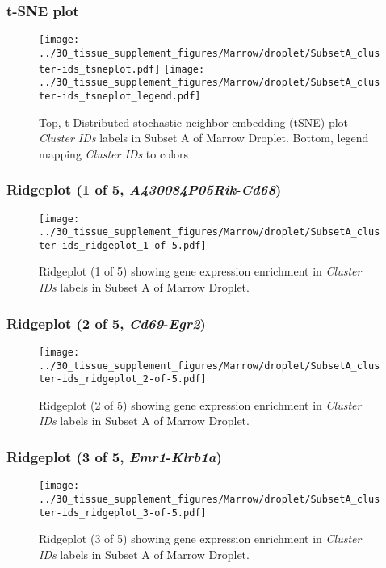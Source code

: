 \clearpage
\subsubsection{t-SNE plot}
\begin{figure}[h]
\centering
\texttt{[image: ../30\_tissue\_supplement\_figures/Marrow/droplet/SubsetA\_cluster-ids\_tsneplot.pdf]}
\texttt{[image: ../30\_tissue\_supplement\_figures/Marrow/droplet/SubsetA\_cluster-ids\_tsneplot\_legend.pdf]}
\caption{Top, t-Distributed stochastic neighbor embedding (tSNE) plot  \emph{Cluster IDs} labels in Subset A of Marrow Droplet. Bottom, legend mapping \emph{Cluster IDs} to colors}
\end{figure}


\clearpage

\subsubsection{Ridgeplot (1 of 5, \emph{A430084P05Rik}-\emph{Cd68})}
\begin{figure}[h]
\centering
\texttt{[image: ../30\_tissue\_supplement\_figures/Marrow/droplet/SubsetA\_cluster-ids\_ridgeplot\_1-of-5.pdf]}

\caption{ Ridgeplot (1 of 5)  showing gene expression enrichment in \emph{Cluster IDs} labels in Subset A of Marrow Droplet. }
\end{figure}


\clearpage

\subsubsection{Ridgeplot (2 of 5, \emph{Cd69}-\emph{Egr2})}
\begin{figure}[h]
\centering
\texttt{[image: ../30\_tissue\_supplement\_figures/Marrow/droplet/SubsetA\_cluster-ids\_ridgeplot\_2-of-5.pdf]}

\caption{ Ridgeplot (2 of 5)  showing gene expression enrichment in \emph{Cluster IDs} labels in Subset A of Marrow Droplet. }
\end{figure}


\clearpage

\subsubsection{Ridgeplot (3 of 5, \emph{Emr1}-\emph{Klrb1a})}
\begin{figure}[h]
\centering
\texttt{[image: ../30\_tissue\_supplement\_figures/Marrow/droplet/SubsetA\_cluster-ids\_ridgeplot\_3-of-5.pdf]}

\caption{ Ridgeplot (3 of 5)  showing gene expression enrichment in \emph{Cluster IDs} labels in Subset A of Marrow Droplet. }
\end{figure}


